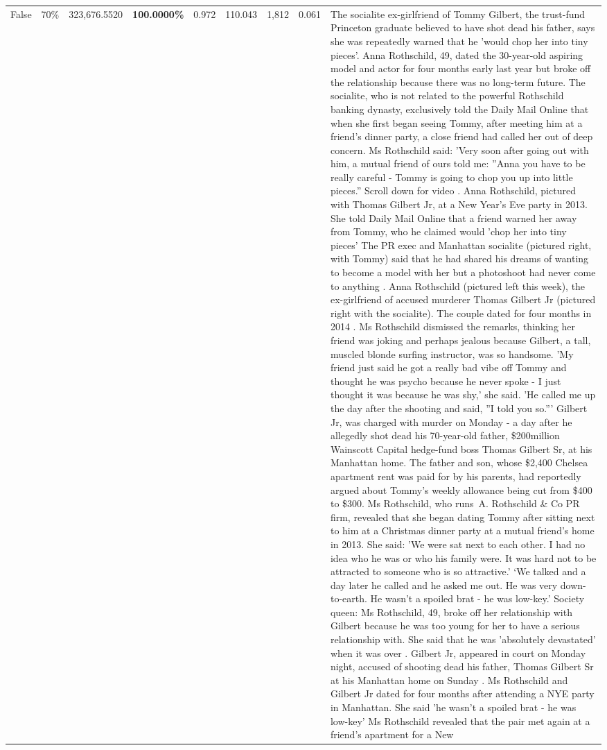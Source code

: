 \begin{table}[H]
\begin{tabular}{lllrlllll}
False & 70\% & 323,676.5520 & \bfseries \color{red} 100.0000\% & 0.972 & 110.043 & 1,812 & 0.061 & The socialite ex-girlfriend of Tommy Gilbert, the trust-fund Princeton graduate believed to have shot dead his father, says she was repeatedly warned that he 'would chop her into tiny pieces'. Anna Rothschild, 49, dated the 30-year-old aspiring model and actor for four months early last year but broke off the relationship because there was no long-term future. The socialite, who is not related to the powerful Rothschild banking dynasty, exclusively told the Daily Mail Online that when she first began seeing Tommy, after meeting him at a friend's dinner party, a close friend had called her out of deep concern. Ms Rothschild said: 'Very soon after going out with him, a mutual friend of ours told me: ''Anna you have to be really careful - Tommy is going to chop you up into little pieces.'' Scroll down for video . Anna Rothschild, pictured with Thomas Gilbert Jr, at a New Year's Eve party in 2013. She told Daily Mail Online that a friend warned her away from Tommy, who he claimed would 'chop her into tiny pieces' The PR exec and Manhattan socialite (pictured right, with Tommy) said that he had shared his dreams of wanting to become a model with her but a photoshoot had never come to anything . Anna Rothschild (pictured left this week), the ex-girlfriend of accused murderer Thomas Gilbert Jr (pictured right with the socialite). The couple dated for four months in 2014 . Ms Rothschild dismissed the remarks, thinking her friend was joking and perhaps jealous because Gilbert, a tall, muscled blonde surfing instructor, was so handsome. 'My friend just said he got a really bad vibe off Tommy and thought he was psycho because he never spoke - I just thought it was because he was shy,' she said. 'He called me up the day after the shooting and said, ''I told you so.''' Gilbert Jr, was charged with murder on Monday - a day after he allegedly shot dead his 70-year-old father, \$200million Wainscott Capital hedge-fund boss Thomas Gilbert Sr, at his Manhattan home. The father and son, whose \$2,400 Chelsea apartment rent was paid for by his parents, had reportedly argued about Tommy's weekly allowance being cut from \$400 to \$300. Ms Rothschild, who runs A. Rothschild \& Co PR firm, revealed that she began dating Tommy after sitting next to him at a Christmas dinner party at a mutual friend's home in 2013. She said: 'We were sat next to each other. I had no idea who he was or who his family were. It was hard not to be attracted to someone who is so attractive.' ‘We talked and a day later he called and he asked me out. He was very down-to-earth. He wasn’t a spoiled brat - he was low-key.’ Society queen: Ms Rothschild, 49, broke off her relationship with Gilbert because he was too young for her to have a serious relationship with. She said that he was 'absolutely devastated' when it was over . Gilbert Jr, appeared in court on Monday night, accused of shooting dead his father, Thomas Gilbert Sr at his Manhattan home on Sunday . Ms Rothschild and Gilbert Jr dated for four months after attending a NYE party in Manhattan. She said 'he wasn't a spoiled brat - he was low-key' Ms Rothschild revealed that the pair met again at a friend’s apartment for a New 
\end{tabular}
\end{table}
